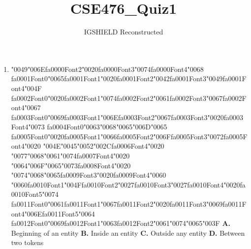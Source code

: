 \documentclass[11pt]{article}
\title{CSE476\_Quiz1}
\author{IGSHIELD Reconstructed}
\date{}
\begin{document}
\maketitle
\begin{enumerate}[leftmargin=*]
  \item {\char"0049}{\char"006E}{\csname fa0000Font2\endcsname\char"0020}{\csname fa0000Font3\endcsname\char"0074}{\csname fa0000Font4\endcsname\char"0068} {\csname fa0001Font0\endcsname\char"0065}{\csname fa0001Font1\endcsname\char"0020}{\csname fa0001Font2\endcsname\char"0042}{\csname fa0001Font3\endcsname\char"0049}{\csname fa0001Font4\endcsname\char"004F} {\csname fa0002Font0\endcsname\char"0020}{\csname fa0002Font1\endcsname\char"0074}{\csname fa0002Font2\endcsname\char"0061}{\csname fa0002Font3\endcsname\char"0067}{\csname fa0002Font4\endcsname\char"0067} {\csname fa0003Font0\endcsname\char"0069}{\csname fa0003Font1\endcsname\char"006E}{\csname fa0003Font2\endcsname\char"0067}{\csname fa0003Font3\endcsname\char"0020}{\csname fa0003Font4\endcsname\char"0073} {\csname fa0004Font0\endcsname\char"0063}{\char"0068}{\char"0065}{\char"006D}{\char"0065} {\csname fa0005Font0\endcsname\char"0020}{\csname fa0005Font1\endcsname\char"0066}{\csname fa0005Font2\endcsname\char"006F}{\csname fa0005Font3\endcsname\char"0072}{\csname fa0005Font4\endcsname\char"0020} {\char"004E}{\char"0045}{\char"0052}{\char"002C}{\csname fa0006Font4\endcsname\char"0020} {\char"0077}{\char"0068}{\char"0061}{\char"0074}{\csname fa0007Font4\endcsname\char"0020} {\char"0064}{\char"006F}{\char"0065}{\char"0073}{\csname fa0008Font4\endcsname\char"0020} {\char"0074}{\char"0068}{\char"0065}{\csname fa0009Font3\endcsname\char"0020}{\csname fa0009Font4\endcsname\char"0060} {\char"0060}{\csname fa0010Font1\endcsname\char"004F}{\csname fa0010Font2\endcsname\char"0027}{\csname fa0010Font3\endcsname\char"0027}{\csname fa0010Font4\endcsname\char"0020}{\csname fa0010Font5\endcsname\char"0074} {\csname fa0011Font0\endcsname\char"0061}{\csname fa0011Font1\endcsname\char"0067}{\csname fa0011Font2\endcsname\char"0020}{\csname fa0011Font3\endcsname\char"0069}{\csname fa0011Font4\endcsname\char"006E}{\csname fa0011Font5\endcsname\char"0064} {\csname fa0012Font0\endcsname\char"0069}{\csname fa0012Font1\endcsname\char"0063}{\csname fa0012Font2\endcsname\char"0061}{\char"0074}{\char"0065}{\char"003F}
    \textbf{A.} Beginning of an entity
    \textbf{B.} Inside an entity
    \textbf{C.} Outside any entity
    \textbf{D.} Between two tokens


\end{enumerate}
\end{document}
